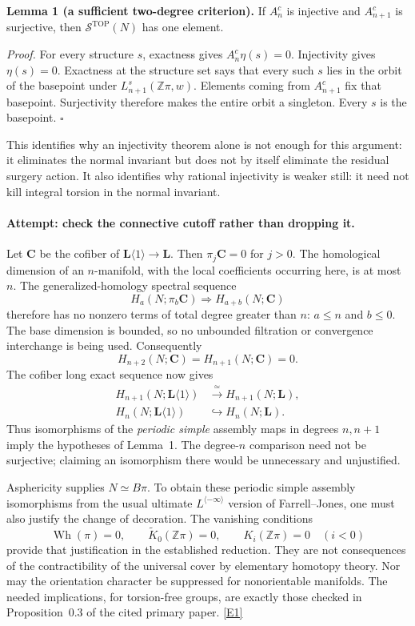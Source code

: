\documentclass[11pt,a4paper]{article}
\newcommand{\Z}{\mathbb{Z}}
\newcommand{\eref}[2]{\hyperlink{extra:#1:#2}{[E#2]}}
\numberwithin{equation}{section}
\begin{document}
\textbf{Lemma 1 (a sufficient two-degree criterion).}
If $A^c_n$ is injective and $A^c_{n+1}$ is surjective, then
$\mathcal S^{\mathrm{TOP}}(N)$ has one element.

\emph{Proof.} For every structure $s$, exactness gives
$A^c_n\eta(s)=0$. Injectivity gives $\eta(s)=0$. Exactness at the
structure set says that every such $s$ lies in the orbit of the basepoint
under $L^s_{n+1}(\Z\pi,w)$. Elements coming from $A^c_{n+1}$ fix that
basepoint. Surjectivity therefore makes the entire orbit a singleton.
Every $s$ is the basepoint. $\square$

This identifies why an injectivity theorem alone is not enough for this
argument: it eliminates the normal invariant but does not by itself
eliminate the residual surgery action. It also identifies why rational
injectivity is weaker still: it need not kill integral torsion in the
normal invariant.

\paragraph{Attempt: check the connective cutoff rather than dropping it.}
Let $\mathbf C$ be the cofiber of
$\mathbf L\langle1\rangle\to\mathbf L$. Then
$\pi_j\mathbf C=0$ for $j>0$. The homological dimension of an
$n$-manifold, with the local coefficients occurring here, is at most $n$.
The generalized-homology spectral sequence
\[
 H_a(N;\pi_b\mathbf C)\Longrightarrow H_{a+b}(N;\mathbf C)
\]
therefore has no nonzero terms of total degree greater than $n$:
$a\leq n$ and $b\leq0$. The base dimension is bounded, so no unbounded
filtration or convergence interchange is being used. Consequently
\[
 H_{n+2}(N;\mathbf C)=H_{n+1}(N;\mathbf C)=0.
\]
The cofiber long exact sequence now gives
\begin{equation}\label{eq:115:comparison}
\begin{aligned}
 H_{n+1}(N;\mathbf L\langle1\rangle)&\xrightarrow{\ \simeq\ }
 H_{n+1}(N;\mathbf L),\\
 H_n(N;\mathbf L\langle1\rangle)&\hookrightarrow H_n(N;\mathbf L).
\end{aligned}
\end{equation}
Thus isomorphisms of the \emph{periodic simple} assembly maps in degrees
$n,n+1$ imply the hypotheses of Lemma~1. The degree-$n$ comparison need
not be surjective; claiming an isomorphism there would be unnecessary
and unjustified.

Asphericity supplies $N\simeq B\pi$. To obtain these periodic simple
assembly isomorphisms from the usual ultimate $L^{\langle-\infty\rangle}$
version of Farrell--Jones, one must also justify the change of decoration.
The vanishing conditions
\[
 \operatorname{Wh}(\pi)=0,\qquad
 \widetilde K_0(\Z\pi)=0,\qquad K_i(\Z\pi)=0\quad(i<0)
\]
provide that justification in the established reduction. They are not
consequences of the contractibility of the universal cover by elementary
homotopy theory. Nor may the orientation character be suppressed for
nonorientable manifolds. The needed implications, for torsion-free groups,
are exactly those checked in Proposition~0.3 of the cited primary paper.
\eref{115}{1}
\end{document}
